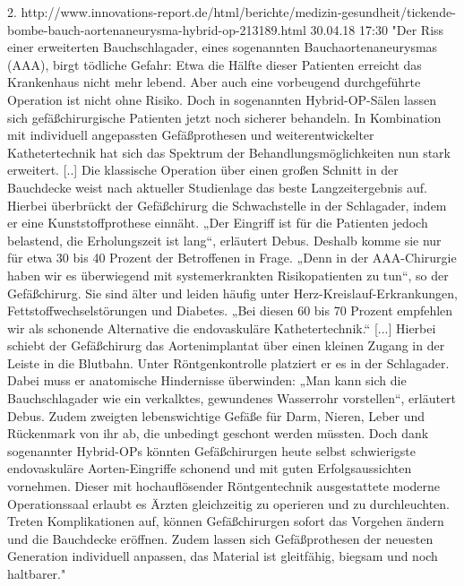 2. http://www.innovations-report.de/html/berichte/medizin-gesundheit/tickende-bombe-bauch-aortenaneurysma-hybrid-op-213189.html 30.04.18 17:30
	"Der Riss einer erweiterten Bauchschlagader, eines sogenannten Bauchaortenaneurysmas (AAA), birgt tödliche Gefahr: Etwa die Hälfte dieser Patienten erreicht das Krankenhaus nicht mehr lebend.
	Aber auch eine vorbeugend durchgeführte Operation ist nicht ohne Risiko. Doch in sogenannten Hybrid-OP-Sälen lassen sich gefäßchirurgische Patienten jetzt noch sicherer behandeln. In Kombination mit individuell angepassten Gefäßprothesen und weiterentwickelter Kathetertechnik hat sich das Spektrum der Behandlungsmöglichkeiten nun stark erweitert. [..]
	Die klassische Operation über einen großen Schnitt in der Bauchdecke weist nach aktueller Studienlage das beste Langzeitergebnis auf. Hierbei überbrückt der Gefäßchirurg die Schwachstelle in der Schlagader, indem er eine Kunststoffprothese einnäht.
	„Der Eingriff ist für die Patienten jedoch belastend, die Erholungszeit ist lang“, erläutert Debus. Deshalb komme sie nur für etwa 30 bis 40 Prozent der Betroffenen in Frage. „Denn in der AAA-Chirurgie haben wir es überwiegend mit systemerkrankten Risikopatienten zu tun“, so der Gefäßchirurg. Sie sind älter und leiden häufig unter Herz-Kreislauf-Erkrankungen, Fettstoffwechselstörungen und Diabetes. „Bei diesen 60 bis 70 Prozent empfehlen wir als schonende Alternative die endovaskuläre Kathetertechnik.“
	[...]
	Hierbei schiebt der Gefäßchirurg das Aortenimplantat über einen kleinen Zugang in der Leiste in die Blutbahn. Unter Röntgenkontrolle platziert er es in der Schlagader. Dabei muss er anatomische Hindernisse überwinden: „Man kann sich die Bauchschlagader wie ein verkalktes, gewundenes Wasserrohr vorstellen“, erläutert Debus. Zudem zweigten lebenswichtige Gefäße für Darm, Nieren, Leber und Rückenmark von ihr ab, die unbedingt geschont werden müssten. Doch dank sogenannter Hybrid-OPs könnten Gefäßchirurgen heute selbst schwierigste endovaskuläre Aorten-Eingriffe schonend und mit guten Erfolgsaussichten vornehmen.
	Dieser mit hochauflösender Röntgentechnik ausgestattete moderne Operationssaal erlaubt es Ärzten gleichzeitig zu operieren und zu durchleuchten. Treten Komplikationen auf, können Gefäßchirurgen sofort das Vorgehen ändern und die Bauchdecke eröffnen. Zudem lassen sich Gefäßprothesen der neuesten Generation individuell anpassen, das Material ist gleitfähig, biegsam und noch haltbarer."



	



	
